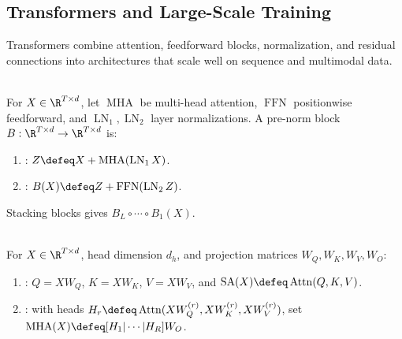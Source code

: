 \subsection{Transformers and Large-Scale Training}

Transformers combine attention, feedforward blocks, normalization, and residual connections into architectures that scale well on sequence and multimodal data.

\begin{definition} \label{def:sl-transformer-block} \\
For $X\in\R^{T\times d}$, let $\operatorname{MHA}$ be multi-head attention, $\operatorname{FFN}$ positionwise feedforward, and $\operatorname{LN}_1,\operatorname{LN}_2$ layer normalizations. A pre-norm block $B:\R^{T\times d}\to\R^{T\times d}$ is:
\begin{enumerate}[label=(\roman*)]
\setlength{\itemsep}{0pt}
\item {}: $Z\defeq X+\operatorname{MHA}(\operatorname{LN}_1X)$.
\item {}: $B(X)\defeq Z+\operatorname{FFN}(\operatorname{LN}_2Z)$.
\end{enumerate}
Stacking blocks gives $B_L\circ\cdots\circ B_1(X)$.
\end{definition}

\begin{definition} \label{def:sl-self-attention} \\
For $X\in\R^{T\times d}$, head dimension $d_h$, and projection matrices $W_Q,W_K,W_V,W_O$:
\begin{enumerate}[label=(\roman*)]
\setlength{\itemsep}{0pt}
\item {}: $Q=XW_Q$, $K=XW_K$, $V=XW_V$, and $\operatorname{SA}(X)\defeq\operatorname{Attn}(Q,K,V)$.
\item {}: with heads $H_r\defeq\operatorname{Attn}(XW_Q^{(r)},XW_K^{(r)},XW_V^{(r)})$, set $\operatorname{MHA}(X)\defeq[H_1|\cdots|H_R]W_O$.
\end{enumerate}
\end{definition}

